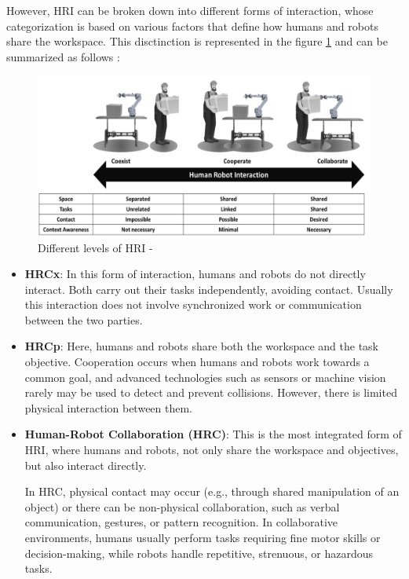 However, \ac{HRI} can be broken down into different forms of interaction, whose categorization is based on various factors that define how 
humans and robots share the workspace. This disctinction is represented in the figure \ref{fig:collab} and can be summarized as follows \cite{Jahanmahin2022}:

\begin{figure}[!htbp]
    \centering
    \includegraphics[width=1.0\linewidth]{figs/collab-coex-coopr.png}
    \caption{Different levels of \ac{HRI} - \cite{Jahanmahin2022}} 
    \label{fig:collab}
\end{figure} 

\begin{itemize}
    \item \textbf{\ac{HRCx}}: In this form of interaction, humans and robots do not directly interact.
    Both carry out their tasks independently, avoiding contact. Usually this interaction does not involve synchronized work 
    or communication between the two parties.

    \item \textbf{\ac{HRCp}}: Here, humans and robots share both the workspace and the task objective. Cooperation occurs when humans
    and robots work towards a common goal, and advanced technologies such as sensors or machine vision rarely may be used to detect and prevent collisions.
    However, there is limited physical interaction between them.

    \item \textbf{Human-Robot Collaboration (\ac{HRC})}: This is the most integrated form of \ac{HRI}, where humans and robots, not only share the workspace and objectives, but also interact directly.
    

    In \ac{HRC}, physical contact may occur (e.g., through shared manipulation of an object) or there can be non-physical collaboration, such as verbal communication, gestures, or pattern recognition. In collaborative environments, humans usually perform tasks requiring fine motor skills or decision-making, while robots handle repetitive, strenuous, or hazardous tasks.

\end{itemize}

